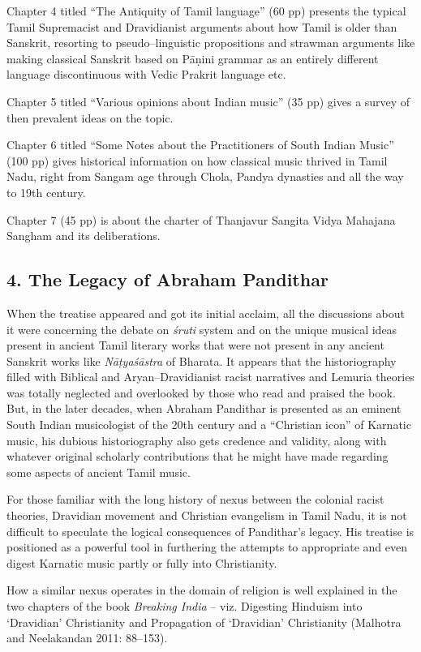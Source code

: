 Chapter 4 titled “The Antiquity of Tamil language” (60 pp) presents the typical Tamil Supremacist and Dravidianist arguments about how Tamil is older than Sanskrit, resorting to pseudo–linguistic propositions and strawman arguments like making classical Sanskrit based on Pāṇini grammar as an entirely different language discontinuous with Vedic Prakrit language etc.

Chapter 5 titled “Various opinions about Indian music” (35 pp) gives a survey of then prevalent ideas on the topic.

Chapter 6 titled “Some Notes about the Practitioners of South Indian Music” (100 pp) gives historical information on how classical music thrived in Tamil Nadu, right from Sangam age through Chola, Pandya dynasties and all the way to 19th century.

Chapter 7 (45 pp) is about the charter of Thanjavur Sangita Vidya Mahajana Sangham and its deliberations.


\subsection*{4. The Legacy of Abraham Pandithar}

When the treatise appeared and got its initial acclaim, all the discussions about it were concerning the debate on \textit{śruti }system and on the unique musical ideas present in ancient Tamil literary works that were not present in any ancient Sanskrit works like \textit{Nāṭyaśāstra} of Bharata. It appears that the historiography filled with Biblical and Aryan–Dravidianist racist narratives and Lemuria theories was totally neglected and overlooked by those who read and praised the book. But, in the later decades, when Abraham Pandithar is presented as an eminent South Indian musicologist of the 20th century and a “Christian icon” of Karnatic music, his dubious historiography also gets credence and validity, along with whatever original scholarly contributions that he might have made regarding some aspects of ancient Tamil music.

For those familiar with the long history of nexus between the colonial racist theories, Dravidian movement and Christian evangelism in Tamil Nadu, it is not difficult to speculate the logical consequences of Pandithar’s legacy. His treatise is positioned as a powerful tool in furthering the attempts to appropriate and even digest Karnatic music partly or fully into Christianity.

How a similar nexus operates in the domain of religion is well explained in the two chapters of the book \textit{Breaking India} – viz. Digesting Hinduism into ‘Dravidian’ Christianity and Propagation of ‘Dravidian’ Christianity (Malhotra and Neelakandan 2011: 88–153).



